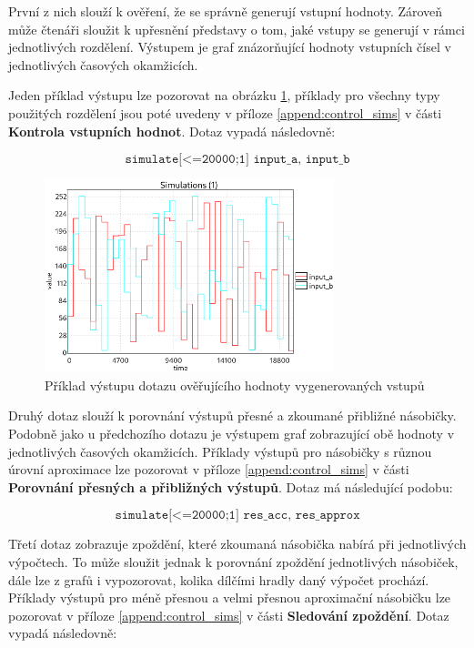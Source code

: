První z nich slouží k ověření, že se správně generují vstupní hodnoty. Zároveň může čtenáři sloužit k upřesnění představy o tom, jaké vstupy se generují v rámci jednotlivých rozdělení. Výstupem je graf znázorňující hodnoty vstupních čísel v jednotlivých časových okamžicích. 

Jeden příklad výstupu lze pozorovat na obrázku \ref{fig:input_sim_example}, příklady pro všechny typy použitých rozdělení jsou poté uvedeny v příloze \ref{append:control_sims} v části \textbf{Kontrola vstupních hodnot}. Dotaz vypadá následovně:

\begin{equation*}
    \texttt{simulate[<=20000;1] {input\_a, input\_b}}
\end{equation*}

\begin{figure}[H]
    \centering
    \includegraphics[width=0.75\textwidth]{obrazky-figures/inputs_uni_uni.png}
    \caption{Příklad výstupu dotazu ověřujícího hodnoty vygenerovaných vstupů}
    \label{fig:input_sim_example}
\end{figure}

Druhý dotaz slouží k porovnání výstupů přesné a zkoumané přibližné násobičky. Podobně jako u předchozího dotazu je výstupem graf zobrazující obě hodnoty v jednotlivých časových okamžicích. Příklady výstupů pro násobičky s různou úrovní aproximace lze pozorovat v příloze \ref{append:control_sims} v části \textbf{Porovnání přesných a přibližných výstupů}. Dotaz má následující podobu:

\begin{equation*}
    \texttt{simulate[<=20000;1] {res\_acc, res\_approx}}
\end{equation*}

Třetí dotaz zobrazuje zpoždění, které zkoumaná násobička nabírá při jednotlivých výpočtech. To může sloužit jednak k porovnání zpoždění jednotlivých násobiček, dále lze z grafů i vypozorovat, kolika dílčími hradly daný výpočet prochází. Příklady výstupů pro méně přesnou a velmi přesnou aproximační násobičku lze pozorovat v příloze \ref{append:control_sims} v části \textbf{Sledování zpoždění}. Dotaz vypadá následovně:

